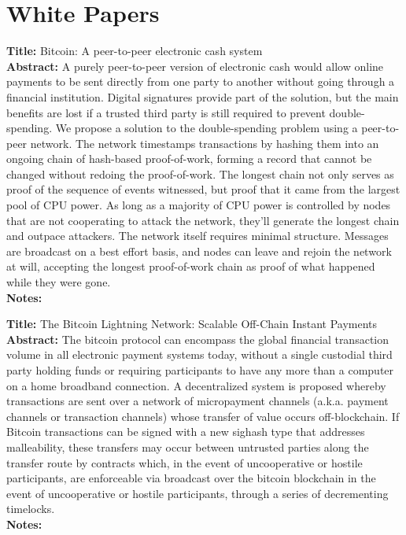 \documentclass[a4paper, 12pt]{scrartcl}
\begin{document}
\section{White Papers}

\textbf{Title:} Bitcoin: A peer-to-peer electronic cash system \parencite{nakamoto2008bitcoin} \\
\textbf{Abstract:} A purely peer-to-peer version of electronic cash would allow online
payments to be sent directly from one party to another without going through a
financial institution. Digital signatures provide part of the solution, but the main
benefits are lost if a trusted third party is still required to prevent double-spending.
We propose a solution to the double-spending problem using a peer-to-peer network.
The network timestamps transactions by hashing them into an ongoing chain of
hash-based proof-of-work, forming a record that cannot be changed without redoing
the proof-of-work. The longest chain not only serves as proof of the sequence of
events witnessed, but proof that it came from the largest pool of CPU power. As
long as a majority of CPU power is controlled by nodes that are not cooperating to
attack the network, they'll generate the longest chain and outpace attackers. The
network itself requires minimal structure. Messages are broadcast on a best effort
basis, and nodes can leave and rejoin the network at will, accepting the longest
proof-of-work chain as proof of what happened while they were gone.\\
\textbf{Notes:} 

\textbf{Title:} The Bitcoin Lightning Network: Scalable Off-Chain Instant Payments \parencite{poon2015bitcoin} \\
\textbf{Abstract:} The bitcoin protocol can encompass the global financial transaction
volume in all electronic payment systems today, without a single custodial
third party holding funds or requiring participants to have any
more than a computer on a home broadband connection. A decentralized
system is proposed whereby transactions are sent over a network of
micropayment channels (a.k.a. payment channels or transaction channels)
whose transfer of value occurs off-blockchain. If Bitcoin transactions
can be signed with a new sighash type that addresses malleability,
these transfers may occur between untrusted parties along the transfer
route by contracts which, in the event of uncooperative or hostile
participants, are enforceable via broadcast over the bitcoin blockchain
in the event of uncooperative or hostile participants, through a series
of decrementing timelocks.\\
\textbf{Notes:} 
\end{document}

